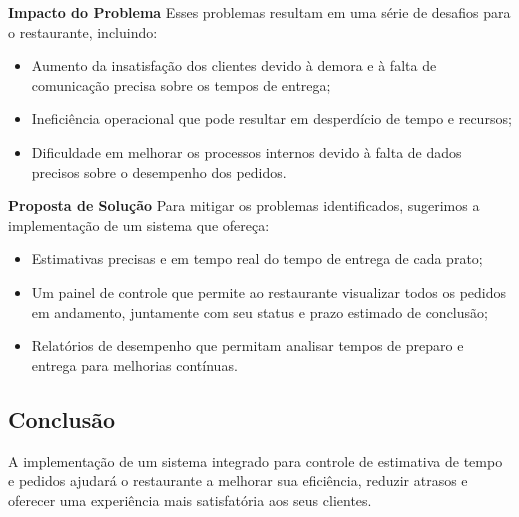 \textbf{Impacto do Problema} Esses problemas resultam em uma série de desafios para o restaurante, incluindo: 
\begin{itemize} 
    \item Aumento da insatisfação dos clientes devido à demora e à falta de comunicação precisa sobre os tempos de entrega; 
    \item Ineficiência operacional que pode resultar em desperdício de tempo e recursos; 
    \item Dificuldade em melhorar os processos internos devido à falta de dados precisos sobre o desempenho dos pedidos. 
\end{itemize}

\textbf{Proposta de Solução} Para mitigar os problemas identificados, sugerimos a implementação de um sistema que ofereça: 
\begin{itemize} 
    \item Estimativas precisas e em tempo real do tempo de entrega de cada prato; 
    \item Um painel de controle que permite ao restaurante visualizar todos os pedidos em andamento, juntamente com seu status e prazo estimado de conclusão; 
    \item Relatórios de desempenho que permitam analisar tempos de preparo e entrega para melhorias contínuas. 
\end{itemize}

\subsection{Conclusão} A implementação de um sistema integrado para controle de estimativa de tempo e pedidos ajudará o restaurante a melhorar sua eficiência, reduzir atrasos e oferecer uma experiência mais satisfatória aos seus clientes.